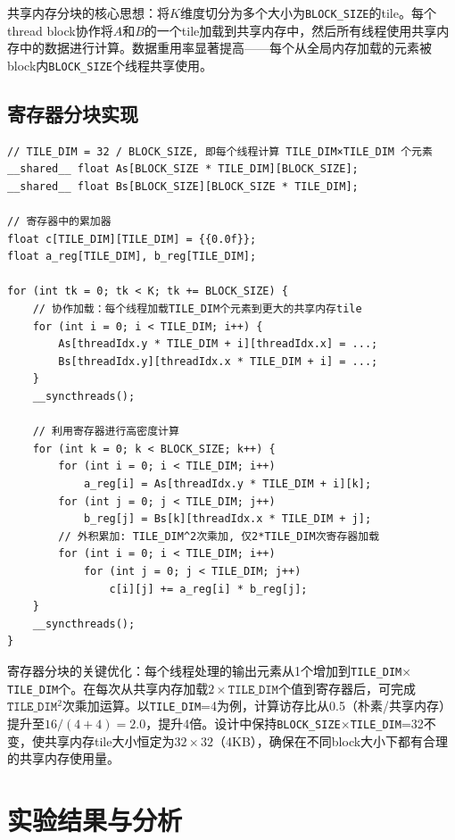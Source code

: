 \documentclass{SYSUReport}
\begin{document}
共享内存分块的核心思想：将$K$维度切分为多个大小为\texttt{BLOCK\_SIZE}的tile。每个thread block协作将$A$和$B$的一个tile加载到共享内存中，然后所有线程使用共享内存中的数据进行计算。数据重用率显著提高——每个从全局内存加载的元素被block内\texttt{BLOCK\_SIZE}个线程共享使用。

\subsection{寄存器分块实现}

\begin{lstlisting}[style=cuda_cpp, caption={寄存器分块矩阵乘法（关键计算部分）}, label={lst:reg}]
// TILE_DIM = 32 / BLOCK_SIZE, 即每个线程计算 TILE_DIM×TILE_DIM 个元素
__shared__ float As[BLOCK_SIZE * TILE_DIM][BLOCK_SIZE];
__shared__ float Bs[BLOCK_SIZE][BLOCK_SIZE * TILE_DIM];

// 寄存器中的累加器
float c[TILE_DIM][TILE_DIM] = {{0.0f}};
float a_reg[TILE_DIM], b_reg[TILE_DIM];

for (int tk = 0; tk < K; tk += BLOCK_SIZE) {
    // 协作加载：每个线程加载TILE_DIM个元素到更大的共享内存tile
    for (int i = 0; i < TILE_DIM; i++) {
        As[threadIdx.y * TILE_DIM + i][threadIdx.x] = ...;
        Bs[threadIdx.y][threadIdx.x * TILE_DIM + i] = ...;
    }
    __syncthreads();

    // 利用寄存器进行高密度计算
    for (int k = 0; k < BLOCK_SIZE; k++) {
        for (int i = 0; i < TILE_DIM; i++)
            a_reg[i] = As[threadIdx.y * TILE_DIM + i][k];
        for (int j = 0; j < TILE_DIM; j++)
            b_reg[j] = Bs[k][threadIdx.x * TILE_DIM + j];
        // 外积累加: TILE_DIM^2次乘加, 仅2*TILE_DIM次寄存器加载
        for (int i = 0; i < TILE_DIM; i++)
            for (int j = 0; j < TILE_DIM; j++)
                c[i][j] += a_reg[i] * b_reg[j];
    }
    __syncthreads();
}
\end{lstlisting}

寄存器分块的关键优化：每个线程处理的输出元素从1个增加到\texttt{TILE\_DIM}$\times$\texttt{TILE\_DIM}个。在每次从共享内存加载$2\times\texttt{TILE\_DIM}$个值到寄存器后，可完成$\texttt{TILE\_DIM}^2$次乘加运算。以\texttt{TILE\_DIM}=4为例，计算访存比从0.5（朴素/共享内存）提升至$16/(4+4)=2.0$，提升4倍。设计中保持\texttt{BLOCK\_SIZE}$\times$\texttt{TILE\_DIM}=32不变，使共享内存tile大小恒定为$32\times 32$（4KB），确保在不同block大小下都有合理的共享内存使用量。

\section{实验结果与分析}
\end{document}
